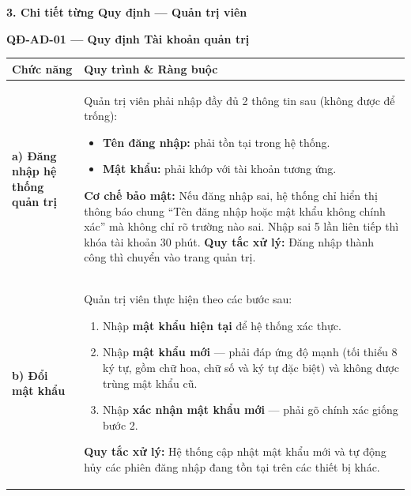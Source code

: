 \documentclass[12pt,a4paper]{article}
\begin{document}
\vspace{0.3cm}
\textbf{3. Chi tiết từng Quy định --- Quản trị viên}

\vspace{0.3cm}
\noindent\textbf{QĐ-AD-01 --- Quy định Tài khoản quản trị}

\begin{longtable}{|
        >{\raggedright\arraybackslash}p{2.8cm}|
        >{\raggedright\arraybackslash}p{12cm}|}
    \hline
    \rowcolor{headerblue}
    \textbf{Chức năng}                      & \textbf{Quy trình \& Ràng buộc}                                                                                                                                              \\
    \hline
    \endhead
    \textbf{a) Đăng nhập hệ thống quản trị} &
    Quản trị viên phải nhập đầy đủ 2 thông tin sau (không được để trống):
    \begin{itemize}[leftmargin=*,topsep=2pt,itemsep=1pt]
        \item \textbf{Tên đăng nhập:} phải tồn tại trong hệ thống.
        \item \textbf{Mật khẩu:} phải khớp với tài khoản tương ứng.
    \end{itemize}
    \textbf{Cơ chế bảo mật:} Nếu đăng nhập sai, hệ thống chỉ hiển thị thông báo chung ``Tên đăng nhập hoặc mật khẩu không chính xác'' mà không chỉ rõ trường nào sai. Nhập sai 5 lần liên tiếp thì khóa tài khoản 30 phút. \newline
    \textbf{Quy tắc xử lý:} Đăng nhập thành công thì chuyển vào trang quản trị.                                                                                                                                            \\
    \hline
    \textbf{b) Đổi mật khẩu}                &
    Quản trị viên thực hiện theo các bước sau:
    \begin{enumerate}[leftmargin=*,topsep=2pt,itemsep=1pt]
        \item Nhập \textbf{mật khẩu hiện tại} để hệ thống xác thực.
        \item Nhập \textbf{mật khẩu mới} --- phải đáp ứng độ mạnh (tối thiểu 8 ký tự, gồm chữ hoa, chữ số và ký tự đặc biệt) và không được trùng mật khẩu cũ.
        \item Nhập \textbf{xác nhận mật khẩu mới} --- phải gõ chính xác giống bước 2.
    \end{enumerate}
    \textbf{Quy tắc xử lý:} Hệ thống cập nhật mật khẩu mới và tự động hủy các phiên đăng nhập đang tồn tại trên các thiết bị khác.                                                                                         \\
    \hline
\end{longtable}
\end{document}

